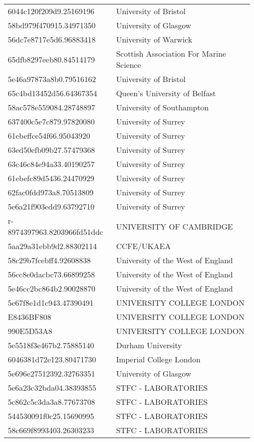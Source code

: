 \begin{tabular}{ll}
6044c120f209d9.25169196 & University of Bristol \\
58bd979f470915.34971350 & University of Glasgow \\
56dc7e8717e5d6.96883418 & University of Warwick \\
65dfb8297eeb80.84514179 & Scottish Association For Marine Science \\
5e46a97873a8b0.79516162 & University of Bristol \\
65c4bd13452d56.64367354 & Queen's University of Belfast \\
58ac578e559084.28748897 & University of Southampton \\
637400c5e7c879.97820080 & University of Surrey \\
61ebeffce54f66.95043920 & University of Surrey \\
63ed50efb09b27.57479368 & University of Surrey \\
63c46c84e94a33.40190257 & University of Surrey \\
61ebefc89d5436.24470929 & University of Surrey \\
62fac0fdd973a8.70513809 & University of Surrey \\
5e6a21f903edd9.63792710 & University of Surrey \\
r-8974397963.8203966fd51ddc & UNIVERSITY OF CAMBRIDGE \\
5aa29a31ebb9d2.88302114 & CCFE/UKAEA \\
58c29b7fcebff4.92608838 & University of the West of England \\
56cc8e0dacbc73.66899258 & University of the West of England \\
5e46cc2bc864b2.90028870 & University of the West of England \\
5e67f8e1d1c943.47390491 & UNIVERSITY COLLEGE LONDON \\
E8436BF808 & UNIVERSITY COLLEGE LONDON \\
990E5D53A8 & UNIVERSITY COLLEGE LONDON \\
5e5518f3e467b2.75885140 & Durham University \\
6046381d72e123.80471730 & Imperial College London \\
5e696e27512392.32763351 & University of Glasgow \\
5e6a23c32bda04.38393855 & STFC - LABORATORIES \\
5c862c5c3da3a8.77673708 & STFC - LABORATORIES \\
544530091f0c25.15690995 & STFC - LABORATORIES \\
58c669f8993403.26303233 & STFC - LABORATORIES \\

\end{tabular}
